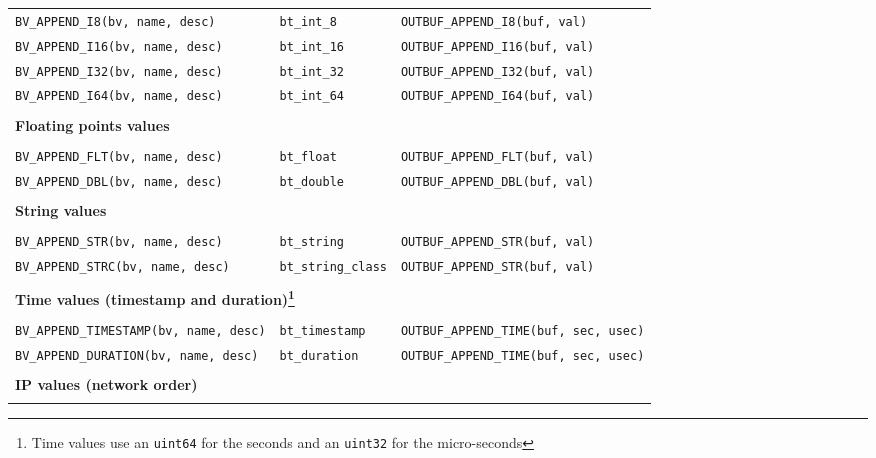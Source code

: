\documentclass[documentation]{subfiles}
\begin{document}
\begin{longtable}{lll}
    {\tt BV\_APPEND\_I8(bv, name, desc)}  & {\tt bt\_int\_8}  & {\tt OUTBUF\_APPEND\_I8(buf, val)}\\
    {\tt BV\_APPEND\_I16(bv, name, desc)} & {\tt bt\_int\_16} & {\tt OUTBUF\_APPEND\_I16(buf, val)}\\
    {\tt BV\_APPEND\_I32(bv, name, desc)} & {\tt bt\_int\_32} & {\tt OUTBUF\_APPEND\_I32(buf, val)}\\
    {\tt BV\_APPEND\_I64(bv, name, desc)} & {\tt bt\_int\_64} & {\tt OUTBUF\_APPEND\_I64(buf, val)}\\

    \\\multicolumn{3}{l}{\bf Floating points values}\\\\

    {\tt BV\_APPEND\_FLT(bv, name, desc)} & {\tt bt\_float}  & {\tt OUTBUF\_APPEND\_FLT(buf, val)}\\
    {\tt BV\_APPEND\_DBL(bv, name, desc)} & {\tt bt\_double} & {\tt OUTBUF\_APPEND\_DBL(buf, val)}\\

    \\\multicolumn{3}{l}{\bf String values}\\\\

    {\tt BV\_APPEND\_STR(bv, name, desc)} & {\tt bt\_string}         & {\tt OUTBUF\_APPEND\_STR(buf, val)}\\
    {\tt BV\_APPEND\_STRC(bv, name, desc)} & {\tt bt\_string\_class} & {\tt OUTBUF\_APPEND\_STR(buf, val)}\\

    \\\multicolumn{3}{l}{\bf Time values (timestamp and duration)\footnote{Time values use an {\tt uint64} for the seconds and an {\tt uint32} for the micro-seconds}}\\\\

    {\tt BV\_APPEND\_TIMESTAMP(bv, name, desc)} & {\tt bt\_timestamp} & {\tt OUTBUF\_APPEND\_TIME(buf, sec, usec)}\\
    {\tt BV\_APPEND\_DURATION(bv, name, desc)}  & {\tt bt\_duration}  & {\tt OUTBUF\_APPEND\_TIME(buf, sec, usec)}\\

    \\\multicolumn{3}{l}{\bf IP values (network order)}\\\\


\end{longtable}
\end{document}

